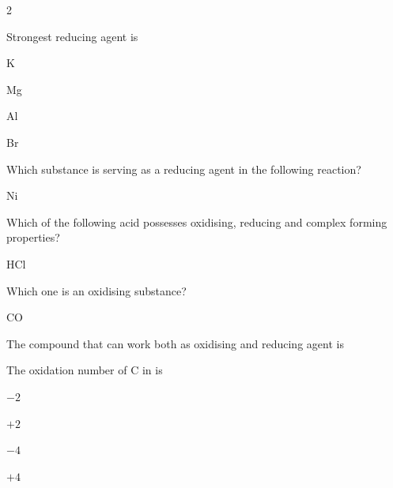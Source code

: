 \documentclass[10pt,a4paper]{article}
\begin{document}
\begin{multicols}{2}
\begin{questions}[start=1]
\item Strongest reducing agent is
\begin{options}
  \item K
  \item Mg
  \item Al
  \item Br
\end{options}

\item Which substance is serving as a reducing agent in the following reaction?\\
\begin{options}
  \item {}
  \item Ni
  \item {}
  \item {}
\end{options}

\item Which of the following acid possesses oxidising, reducing and complex forming properties?
\begin{options}
  \item {}
  \item {}
  \item HCl
  \item {}
\end{options}

\item Which one is an oxidising substance?
\begin{options}
  \item {}
  \item CO
  \item {}
  \item {}
\end{options}

\item The compound that can work both as oxidising and reducing agent is
\begin{options}
  \item {}
  \item {}
  \item {}
  \item {}
\end{options}

\item The oxidation number of C in  is
\begin{options}
  \item $-2$
  \item $+2$
  \item $-4$
  \item $+4$
\end{options}


\end{questions}
\end{multicols}
\end{document}
